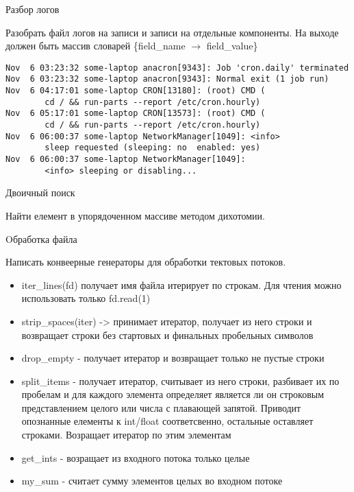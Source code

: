 \documentclass{article}
\begin{document}
\begin{center} Разбор логов \end{center}
Разобрать файл логов на записи и записи на отдельные компоненты.
На выходе должен быть массив словарей \{field\_name $\rightarrow$ field\_value\}
\begin{Large}
\begin{lstlisting}
Nov  6 03:23:32 some-laptop anacron[9343]: Job 'cron.daily' terminated
Nov  6 03:23:32 some-laptop anacron[9343]: Normal exit (1 job run)
Nov  6 04:17:01 some-laptop CRON[13180]: (root) CMD (   
        cd / && run-parts --report /etc/cron.hourly)
Nov  6 05:17:01 some-laptop CRON[13573]: (root) CMD (   
        cd / && run-parts --report /etc/cron.hourly)
Nov  6 06:00:37 some-laptop NetworkManager[1049]: <info> 
        sleep requested (sleeping: no  enabled: yes)
Nov  6 06:00:37 some-laptop NetworkManager[1049]: 
        <info> sleeping or disabling...
\end{lstlisting}
\end{Large}
\newpage

\begin{center} Двоичный поиск \end{center}
Найти елемент в упорядоченном массиве методом дихотомии.
\newpage

\begin{center} Oбработка файла \end{center}
Написать конвеерные генераторы для обработки тектовых потоков.
\begin{itemize}
    \item iter\_lines(fd) получает имя файла итерирует по строкам. 
           Для чтения можно использовать только fd.read(1)
    \item strip\_spaces(iter) -> принимает итератор, получает из него 
          строки и возвращает строки без стартовых и финальных пробельных символов
    \item drop\_empty - получает итератор и возвращает только не пустые строки
    \item split\_items - получает итератор, считывает из него строки, 
          разбивает их по пробелам и для каждого элемента определяет является ли он
          строковым представлением целого или числа с плавающей запятой.
          Приводит опознанные елементы к int/float соответсвенно, остальные оставляет
          строками. Возращает итератор по этим элементам
    \item get\_ints - возращает из входного потока только целые
    \item my\_sum - считает сумму элементов целых во входном потоке
\end{itemize}
\end{document}
